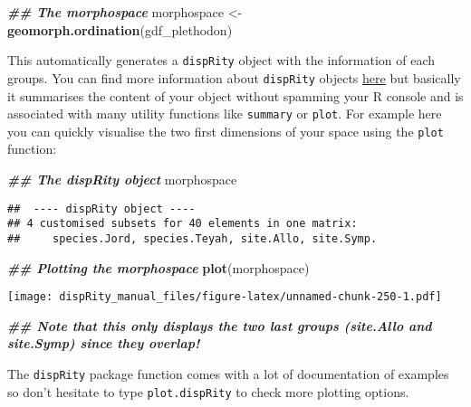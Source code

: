 \documentclass[
]{book}
\newenvironment{Shaded}{\begin{snugshade}}{\end{snugshade}}
\newcommand{\DocumentationTok}[1]{\textcolor[rgb]{0.56,0.35,0.01}{\textbf{\textit{#1}}}}
\newcommand{\FunctionTok}[1]{\textcolor[rgb]{0.13,0.29,0.53}{\textbf{#1}}}
\newcommand{\NormalTok}[1]{#1}
\newcommand{\OtherTok}[1]{\textcolor[rgb]{0.56,0.35,0.01}{#1}}
\begin{document}
\begin{Shaded}
\begin{Highlighting}[]
\DocumentationTok{\#\# The morphospace}
\NormalTok{morphospace }\OtherTok{\textless{}{-}} \FunctionTok{geomorph.ordination}\NormalTok{(gdf\_plethodon)}
\end{Highlighting}
\end{Shaded}

This automatically generates a \texttt{dispRity} object with the information of each groups. You can find more information about \texttt{dispRity} objects \protect\hyperlink{disprity-object}{here} but basically it summarises the content of your object without spamming your R console and is associated with many utility functions like \texttt{summary} or \texttt{plot}. For example here you can quickly visualise the two first dimensions of your space using the \texttt{plot} function:

\begin{Shaded}
\begin{Highlighting}[]
\DocumentationTok{\#\# The dispRity object}
\NormalTok{morphospace}
\end{Highlighting}
\end{Shaded}

\begin{verbatim}
##  ---- dispRity object ---- 
## 4 customised subsets for 40 elements in one matrix:
##     species.Jord, species.Teyah, site.Allo, site.Symp.
\end{verbatim}

\begin{Shaded}
\begin{Highlighting}[]
\DocumentationTok{\#\# Plotting the morphospace}
\FunctionTok{plot}\NormalTok{(morphospace)}
\end{Highlighting}
\end{Shaded}

\texttt{[image: dispRity\_manual\_files/figure-latex/unnamed-chunk-250-1.pdf]}

\begin{Shaded}
\begin{Highlighting}[]
\DocumentationTok{\#\# Note that this only displays the two last groups (site.Allo and site.Symp) since they overlap!}
\end{Highlighting}
\end{Shaded}

The \texttt{dispRity} package function comes with a lot of documentation of examples so don't hesitate to type \texttt{plot.dispRity} to check more plotting options.
\end{document}
